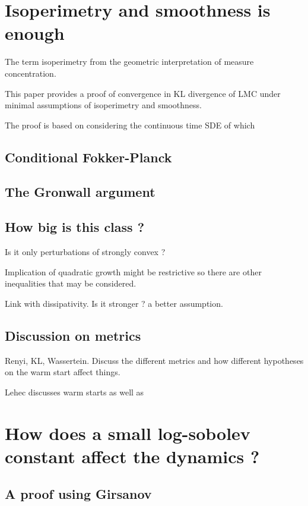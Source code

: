 \documentclass[11pt,twoside]{article}
\begin{document}
\section{Isoperimetry and smoothness is enough}

The term isoperimetry from the geometric interpretation of measure concentration.

This paper provides a proof of convergence in KL divergence of LMC under minimal assumptions of isoperimetry and smoothness.

The proof is based on considering the continuous time SDE of which 

\subsection{Conditional Fokker-Planck}

\subsection{The Gronwall argument}

\subsection{How big is this class ?}

Is it only perturbations of strongly convex ?

Implication of  quadratic growth might be restrictive so there are other inequalities that may be considered. 

Link with dissipativity. Is it stronger ? a better assumption.

\subsection{Discussion on metrics}

Renyi, KL, Wassertein.
Discuss the different metrics and how different hypotheses on the warm start affect things.

Lehec discusses warm starts as well as 

\section{How does a small log-sobolev constant affect the dynamics ?}

\subsection{A proof using Girsanov}
\end{document}
